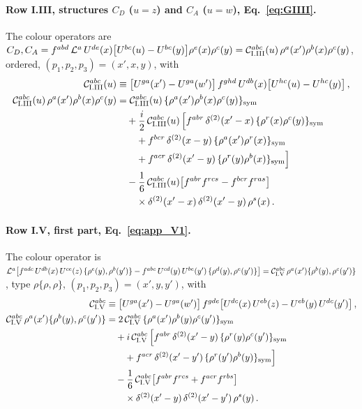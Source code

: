 \paragraph{Row I.III, structures $C_D$ ($u=z$) and $C_A$ ($u=w$), Eq.~\eqref{eq:GIIII}.} The colour operators are $C_D,C_A=f^{abd}\,\mathcal L^a\,U^{de}(x)\big[U^{bc}(u)-U^{bc}(y)\big]\rho^e(x)\rho^c(y)=\mathcal C^{abc}_{\rm I.III}(u)\,\rho^a(x')\rho^b(x)\rho^c(y)$, ordered, $(p_1,p_2,p_3)=(x',x,y)$, with
\begin{align}
\mathcal C^{abc}_{\rm I.III}(u)&\equiv \big[U^{ga}(x')-U^{ga}(w')\big]\,f^{ghd}\,U^{db}(x)\big[U^{hc}(u)-U^{hc}(y)\big]\,,\notag\\
\mathcal C^{abc}_{\rm I.III}(u)\,\rho^a(x')\rho^b(x)\rho^c(y)
&=\mathcal C^{abc}_{\rm I.III}(u)\,\{\rho^a(x')\rho^b(x)\rho^c(y)\}_{\rm sym}\notag\\
&\quad+\frac i2\,\mathcal C^{abc}_{\rm I.III}(u)\,\Big[f^{abr}\,\delta^{(2)}(x'-x)\,\{\rho^{r}(x)\rho^{c}(y)\}_{\rm sym}\notag\\
&\qquad+f^{bcr}\,\delta^{(2)}(x-y)\,\{\rho^{a}(x')\rho^{r}(x)\}_{\rm sym}\notag\\
&\qquad+f^{acr}\,\delta^{(2)}(x'-y)\,\{\rho^{r}(y)\rho^{b}(x)\}_{\rm sym}\Big]\notag\\
&\quad-\frac16\,\mathcal C^{abc}_{\rm I.III}(u)\big[f^{abr}f^{rcs}-f^{bcr}f^{ras}\big]\notag\\
&\qquad\times\delta^{(2)}(x'-x)\,\delta^{(2)}(x'-y)\,\rho^s(x)\,.\label{eq:app_sym_IIII}
\end{align}
\paragraph{Row I.V, first part, Eq.~\eqref{eq:app_V1}.} The colour operator is $\mathcal L^a\big[f^{adc}\,U^{db}(x)\,U^{ce}(z)\,\{\rho^e(y),\rho^b(y')\}-f^{abc}\,U^{cd}(y)\,U^{be}(y')\,\{\rho^d(y),\rho^e(y')\}\big]=\mathcal C^{abc}_{\rm I.V}\,\rho^a(x')\{\rho^b(y),\rho^c(y')\}$, type $\rho\{\rho,\rho\}$, $(p_1,p_2,p_3)=(x',y,y')$, with
\begin{align}
\mathcal C^{abc}_{\rm I.V}&\equiv \big[U^{ga}(x')-U^{ga}(w')\big]\,f^{gde}\big[U^{dc}(x)\,U^{eb}(z)-U^{eb}(y)\,U^{dc}(y')\big]\,,\notag\\
\mathcal C^{abc}_{\rm I.V}\,\rho^a(x')\{\rho^b(y),\rho^c(y')\}
&=2\,\mathcal C^{abc}_{\rm I.V}\,\{\rho^a(x')\rho^b(y)\rho^c(y')\}_{\rm sym}\notag\\
&\quad+i\,\mathcal C^{abc}_{\rm I.V}\,\Big[f^{abr}\,\delta^{(2)}(x'-y)\,\{\rho^{r}(y)\rho^{c}(y')\}_{\rm sym}\notag\\
&\qquad+f^{acr}\,\delta^{(2)}(x'-y')\,\{\rho^{r}(y')\rho^{b}(y)\}_{\rm sym}\Big]\notag\\
&\quad-\frac16\,\mathcal C^{abc}_{\rm I.V}\big[f^{abr}f^{rcs}+f^{acr}f^{rbs}\big]\notag\\
&\qquad\times\delta^{(2)}(x'-y)\,\delta^{(2)}(x'-y')\,\rho^s(y)\,.\label{eq:app_sym_IV1}
\end{align}
